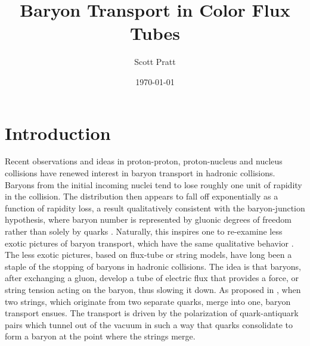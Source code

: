 \documentclass[aps, prc, 12pt, nofootinbib, showpacs, superscriptaddress, tightenlines, groupedaddress]{revtex4-2}
\begin{document}
\title{Baryon Transport in Color Flux Tubes}
\author{Scott Pratt}
\date{\today}

\pacs{}

\begin{abstract}

\end{abstract}

\maketitle

\section{Introduction}

Recent observations and ideas in proton-proton, proton-nucleus and nucleus collisions have renewed interest in baryon transport in hadronic collisions\cite{Brandenburg:2022hrp,STAR:2008med,STAR:2017sal,BRAHMS:2003wwg}. Baryons from the initial incoming nuclei tend to lose roughly one unit of rapidity in the collision. The distribution then appears to fall off exponentially as a function of rapidity loss, a result qualitatively consistent with the baryon-junction hypothesis, where baryon number is represented by gluonic degrees of freedom rather than solely by quarks \cite{Kharzeev:1996sq}. Naturally, this inspires one to re-examine less exotic pictures of baryon transport, which have the same qualitative behavior \cite{Vance:1997th}. The less exotic pictures, based on flux-tube or string models, have long been a staple of the stopping of baryons in hadronic collisions. The idea is that baryons, after exchanging a gluon, develop a tube of electric flux that provides a force, or string tension acting on the baryon, thus slowing it down. As proposed in \cite{Vance:1997th}, when two strings, which originate from two separate quarks, merge into one, baryon transport ensues. The transport is driven by the polarization of quark-antiquark pairs which tunnel out of the vacuum in such a way that quarks consolidate to form a baryon at the point where the strings merge.  
\end{document}
